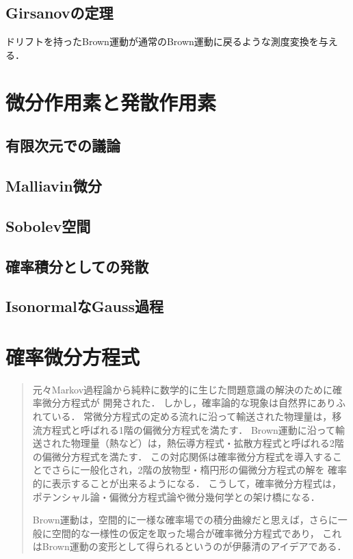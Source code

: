 \documentclass[uplatex,dvipdfmx]{jsreport}
\begin{document}
\section{Girsanovの定理}

\begin{tcolorbox}[colframe=ForestGreen, colback=ForestGreen!10!white,breakable,colbacktitle=ForestGreen!40!white,coltitle=black,fonttitle=\bfseries\sffamily,
title=]
    ドリフトを持ったBrown運動が通常のBrown運動に戻るような測度変換を与える．
\end{tcolorbox}

\chapter{微分作用素と発散作用素}

\section{有限次元での議論}

\section{Malliavin微分}

\section{Sobolev空間}

\section{確率積分としての発散}

\section{IsonormalなGauss過程}

\chapter{確率微分方程式}

\begin{quotation}
    元々Markov過程論から純粋に数学的に生じた問題意識の解決のために確率微分方程式が
    開発された．
    しかし，確率論的な現象は自然界にありふれている．
    常微分方程式の定める流れに沿って輸送された物理量は，移流方程式と呼ばれる1階の偏微分方程式を満たす．
    Brown運動に沿って輸送された物理量（熱など）は，熱伝導方程式・拡散方程式と呼ばれる2階の偏微分方程式を満たす．
    この対応関係は確率微分方程式を導入することでさらに一般化され，2階の放物型・楕円形の偏微分方程式の解を
    確率的に表示することが出来るようになる．
    こうして，確率微分方程式は，ポテンシャル論・偏微分方程式論や微分幾何学との架け橋になる．

    Brown運動は，空間的に一様な確率場での積分曲線だと思えば，さらに一般に空間的な一様性の仮定を取った場合が確率微分方程式であり，
    これはBrown運動の変形として得られるというのが伊藤清のアイデアである．
\end{quotation}
\end{document}
